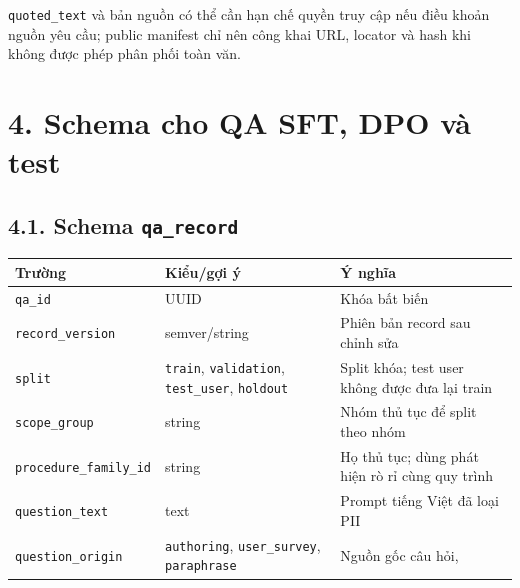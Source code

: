\documentclass[11pt,a4paper]{article}
\begin{document}
\nolinkurl{quoted_text} và bản nguồn có thể cần hạn chế quyền truy cập
nếu điều khoản nguồn yêu cầu; public manifest chỉ nên công khai URL,
locator và hash khi không được phép phân phối toàn văn.

\section{4. Schema cho QA SFT, DPO và
test}\label{schema-cho-qa-sft-dpo-vuxe0-test}

\subsection{\texorpdfstring{4.1. Schema
\nolinkurl{qa_record}}{4.1. Schema }}\label{schema-qa_record}

{\def\LTcaptype{none} %
\begin{longtable}[]{@{}
  >{\raggedright\arraybackslash}p{}
  >{\raggedright\arraybackslash}p{}
  >{\raggedright\arraybackslash}p{}@{}}
\toprule\noalign{}
\begin{minipage}[b]{\linewidth}\raggedright
Trường
\end{minipage} & \begin{minipage}[b]{\linewidth}\raggedright
Kiểu/gợi ý
\end{minipage} & \begin{minipage}[b]{\linewidth}\raggedright
Ý nghĩa
\end{minipage} \\
\midrule\noalign{}
\endhead
\bottomrule\noalign{}
\endlastfoot
\nolinkurl{qa_id} & UUID & Khóa bất biến \\
\nolinkurl{record_version} & semver/string & Phiên bản record sau chỉnh
sửa \\
\nolinkurl{split} & \nolinkurl{train}, \nolinkurl{validation},
\nolinkurl{test_user}, \nolinkurl{holdout} & Split khóa; test user không
được đưa lại train \\
\nolinkurl{scope_group} & string & Nhóm thủ tục để split theo nhóm \\
\nolinkurl{procedure_family_id} & string & Họ thủ tục; dùng phát hiện rò
rỉ cùng quy trình \\
\nolinkurl{question_text} & text & Prompt tiếng Việt đã loại PII \\
\nolinkurl{question_origin} & \nolinkurl{authoring},
\nolinkurl{user_survey}, \nolinkurl{paraphrase} & Nguồn gốc câu hỏi,

\end{longtable}}
\end{document}
